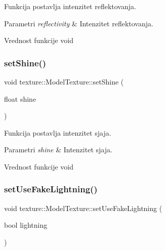 Funkcija postavlja intenzitet reflektovanja. 


\begin{DoxyParams}{Parametri}
{\em reflectivity} & Intenzitet reflektovanja. \\
\hline
\end{DoxyParams}
\begin{DoxyReturn}{Vrednost funkcije}
void 
\end{DoxyReturn}
\mbox{\label{classtexture_1_1ModelTexture_a782076c3a92f7d92cd45a92c5ef088a1}} 
\subsubsection{\texorpdfstring{set\+Shine()}{setShine()}}
{\footnotesize\ttfamily void texture\+::\+Model\+Texture\+::set\+Shine (\begin{DoxyParamCaption}\item[{float}]{shine }\end{DoxyParamCaption})}



Funkcija postavlja intenzitet sjaja. 


\begin{DoxyParams}{Parametri}
{\em shine} & Intenzitet sjaja. \\
\hline
\end{DoxyParams}
\begin{DoxyReturn}{Vrednost funkcije}
void 
\end{DoxyReturn}
\mbox{\label{classtexture_1_1ModelTexture_a616d99807f2487d6723380ec03b57ede}} 
\subsubsection{\texorpdfstring{set\+Use\+Fake\+Lightning()}{setUseFakeLightning()}}
{\footnotesize\ttfamily void texture\+::\+Model\+Texture\+::set\+Use\+Fake\+Lightning (\begin{DoxyParamCaption}\item[{bool}]{lightning }\end{DoxyParamCaption})}



